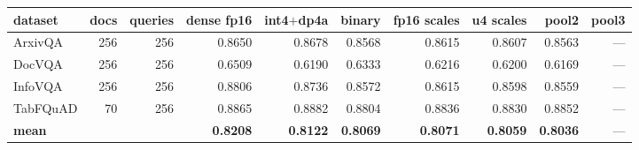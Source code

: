 \begin{tabular}{l r r r r r r r r r }
\toprule
dataset & docs & queries & dense fp16 & int4$+$dp4a & binary & fp16 scales & u4 scales & pool2 & pool3 \\
\midrule
ArxivQA & 256 & 256 & 0.8650 & 0.8678 & 0.8568 & 0.8615 & 0.8607 & 0.8563 & --- \\
DocVQA & 256 & 256 & 0.6509 & 0.6190 & 0.6333 & 0.6216 & 0.6200 & 0.6169 & --- \\
InfoVQA & 256 & 256 & 0.8806 & 0.8736 & 0.8572 & 0.8615 & 0.8598 & 0.8559 & --- \\
TabFQuAD & 70 & 256 & 0.8865 & 0.8882 & 0.8804 & 0.8836 & 0.8830 & 0.8852 & --- \\
\midrule
\textbf{mean} &  &  & \textbf{0.8208} & \textbf{0.8122} & \textbf{0.8069} & \textbf{0.8071} & \textbf{0.8059} & \textbf{0.8036} & --- \\
\bottomrule
\end{tabular}
